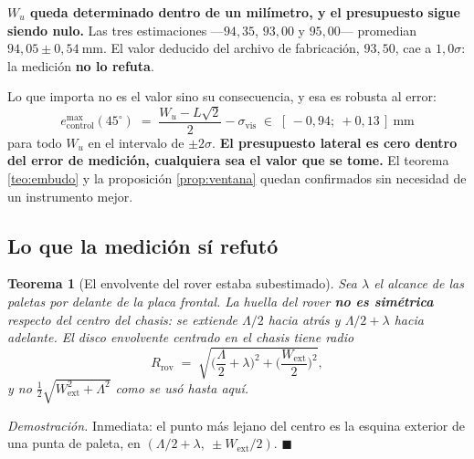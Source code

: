 \documentclass[11pt,a4paper]{article}
\newtheorem{teorema}{Teorema}[section]
\theoremstyle{definition}
\newenvironment{demo}{\par\noindent\textit{Demostración.}\;}{\hfill$\blacksquare$\par\medskip}
\newcommand{\grados}{^{\circ}}
\begin{document}
\begin{resultado}
\textbf{$W_u$ queda determinado dentro de un milímetro, y el presupuesto sigue siendo
nulo.} Las tres estimaciones ---$94{,}35$, $93{,}00$ y $95{,}00$--- promedian
$94{,}05 \pm 0{,}54\ \mathrm{mm}$. El valor deducido del archivo de fabricación,
$93{,}50$, cae a $1{,}0\sigma$: la medición \textbf{no lo refuta}.

Lo que importa no es el valor sino su consecuencia, y esa es robusta al error:
\[
  e^{\max}_{\mathrm{control}}(45\grados) \;=\; \frac{W_u - L\sqrt2}{2} - \sigma_{\mathrm{vis}}
  \;\in\; [\,-0{,}94;\ +0{,}13\,]\ \mathrm{mm}
\]
para todo $W_u$ en el intervalo de $\pm2\sigma$. \textbf{El presupuesto lateral es cero
dentro del error de medición, cualquiera sea el valor que se tome.} El teorema
\ref{teo:embudo} y la proposición \ref{prop:ventana} quedan confirmados sin necesidad de
un instrumento mejor.
\end{resultado}

\subsection{Lo que la medición sí refutó}

\begin{teorema}[El envolvente del rover estaba subestimado]
\label{teo:envolvente}
Sea $\lambda$ el alcance de las paletas por delante de la placa frontal. La huella del
rover \textbf{no es simétrica} respecto del centro del chasis: se extiende $\Lambda/2$
hacia atrás y $\Lambda/2 + \lambda$ hacia adelante. El disco envolvente centrado en el
chasis tiene radio
\begin{equation}
  R_{\mathrm{rov}} \;=\; \sqrt{\Big(\frac{\Lambda}{2}+\lambda\Big)^{2} + \Big(\frac{W_{\mathrm{ext}}}{2}\Big)^{2}},
  \label{eq:Rrov-real}
\end{equation}
y no $\tfrac12\sqrt{W_{\mathrm{ext}}^2+\Lambda^2}$ como se usó hasta aquí.
\end{teorema}

\begin{demo}
Inmediata: el punto más lejano del centro es la esquina exterior de una punta de paleta,
en $(\Lambda/2+\lambda,\ \pm W_{\mathrm{ext}}/2)$.
\end{demo}
\end{document}
